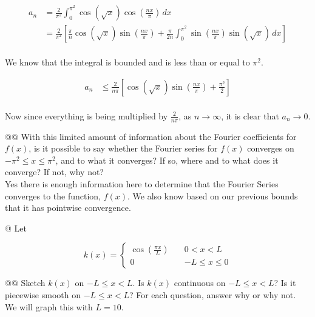 \documentclass[10pt]{article}
\begin{document}
\begin{easylist}[enumerate]
    \begin{align*}
        a_n &= \frac{2}{\pi^2} \int_0^{\pi^2} \cos(\sqrt{x}) \cos\left(\frac{nx}{\pi}\right) \, dx\\
        &= \frac{2}{\pi^2} \left[ \frac{\pi}{n} \cos(\sqrt{x}) \sin\left(\frac{nx}{\pi}\right) + \frac{\pi}{2n} \int_0^{\pi^2} \sin\left(\frac{nx}{\pi}\right) \sin(\sqrt{x}) \, dx \right]\\
    \end{align*}

    We know that the integral is bounded and is less than or equal to $\pi^2$.

    \begin{align*}
        a_n &\le \frac{2}{n\pi} \left[ \cos(\sqrt{x}) \sin\left(\frac{nx}{\pi}\right) + \frac{\pi^2}{2} \right]\\
    \end{align*}

    Now since everything is being multiplied by $\frac{2}{n\pi}$, as $n \to \infty$, it is clear that $a_n \to 0$.

    @@ With this limited amount of information about the Fourier coefficients for $f(x)$, is it possible to say whether
    the Fourier series for $f(x)$ converges on $-\pi^2 \le x \le \pi^2$, and to what it converges? If so, where and to
    what does it converge? If not, why not?\\

    Yes there is enough information here to determine that the Fourier Series converges to the function, $f(x)$. We also
    know based on our previous bounds that it has pointwise convergence.

    \newpage
    @ Let

    \[
        k(x) = \begin{cases}
            \cos\left(\frac{\pi x}{L}\right) \quad &0 < x < L\\
            0 \quad & -L \le x \le 0
        \end{cases}
    \]

    @@ Sketch $k(x)$ on $-L \le x < L$. Is $k(x)$ continuous on $-L \le x < L$? Is it piecewise smooth on $-L \le x <
    L$? For each question, answer why or why not.\\

    We will graph this with $L=10$.

\weave


\end{easylist}
\end{document}
